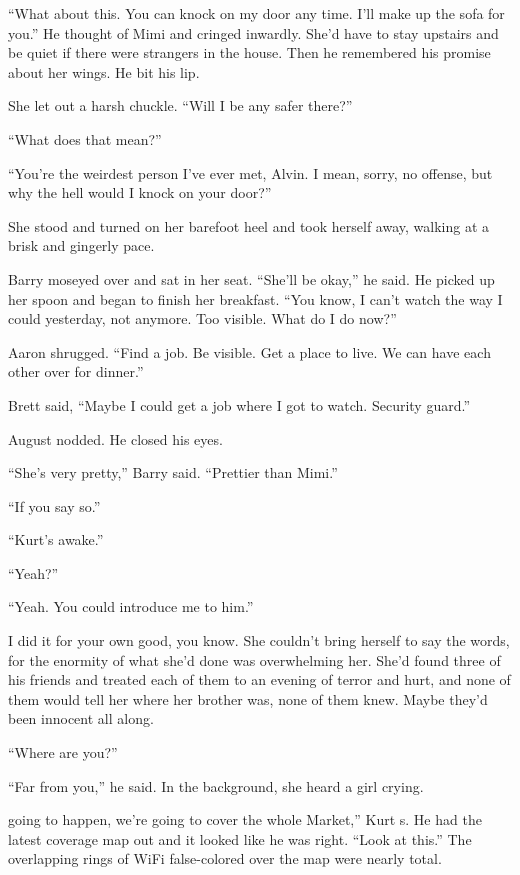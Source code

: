 ``What about this.  You can knock on my door any time.  I'll make up
the sofa for you.'' He thought of Mimi and cringed inwardly.  She'd
have to stay upstairs and be quiet if there were strangers in the
house.  Then he remembered his promise about her wings.  He bit his
lip.

She let out a harsh chuckle.  ``Will I be any safer there?''

``What does that mean?''

``You're the weirdest person I've ever met, Alvin.  I mean, sorry, no
offense, but why the hell would I knock on your door?''

She stood and turned on her barefoot heel and took herself away,
walking at a brisk and gingerly pace.

Barry moseyed over and sat in her seat.  ``She'll be okay,'' he said. 
He picked up her spoon and began to finish her breakfast.  ``You know,
I can't watch the way I could yesterday, not anymore.  Too visible. 
What do I do now?''

Aaron shrugged.  ``Find a job.  Be visible.  Get a place to live.  We
can have each other over for dinner.''

Brett said, ``Maybe I could get a job where I got to watch.  Security
guard.''

August nodded.  He closed his eyes.

``She's very pretty,'' Barry said.  ``Prettier than Mimi.''

``If you say so.''

``Kurt's awake.''

``Yeah?''

``Yeah.  You could introduce me to him.''

I did it for your own good, you know.  She couldn't bring herself to
say the words, for the enormity of what she'd done was overwhelming
her.  She'd found three of his friends and treated each of them to an
evening of terror and hurt, and none of them would tell her where her
brother was, none of them knew.  Maybe they'd been innocent all along.

``Where are you?''

``Far from you,'' he said.  In the background, she heard a girl
crying.

going to happen, we're going to cover the whole Market,'' Kurt
s.  He had the latest coverage map out and it looked like he was
right.  ``Look at this.'' The overlapping rings of WiFi false-colored
over the map were nearly total. 

